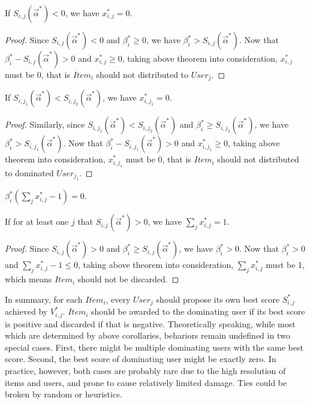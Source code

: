 \documentclass[sigconf]{acmart}
\newcommand{\sx}{x_{i,j}}
\newcommand{\sV}{V_{i,j}}
\newcommand{\sbeta}{\beta_i}
\newcommand{\sS}{S_{i,j}}
\newcommand{\valpha}{\vec{\alpha}}
\begin{document}
\begin{corollary}
If $\sS(\valpha^*) < 0$, we have $\sx^* = 0$.
\end{corollary}

\begin{proof}
Since $\sS(\valpha^*) < 0$ and $\sbeta^* \ge 0$, we have $\sbeta^* > \sS(\valpha^*)$.
Now that $\sbeta^* - \sS(\valpha^*) > 0$ and $\sx^* \ge 0$,
    taking above theorem into consideration, $\sx^*$ must be 0,
    that is $Item_i$ should not distributed to $User_j$.
\end{proof}

\begin{corollary}
If $S_{i,j_1}(\valpha^*) < S_{i,j_2}(\valpha^*)$, we have $x_{i,j_1}^* = 0$.
\end{corollary}

\begin{proof}
Similarly, since $S_{i,j_1}(\valpha^*) < S_{i,j_2}(\valpha^*)$ and $\sbeta^* \ge S_{i,j_2}(\valpha^*)$,
    we have $\sbeta^* > S_{i,j_1}(\valpha^*)$.
Now that $\sbeta^* - S_{i,j_1}(\valpha^*) > 0$ and $x_{i,j_1}^* \ge 0$, 
    taking above theorem into consideration, $x_{i,j_1}^*$ must be 0,
    that is $Item_i$ should not distributed to dominated $User_{j_1}$.
\end{proof}

\begin{theorem}
$\sbeta^*(\sum\limits_j \sx^* - 1) = 0$.
\end{theorem}

\begin{corollary}
If for at least one $j$ that $\sS(\valpha^*) > 0$, we have $\sum\limits_j \sx^* = 1$.
\end{corollary}

\begin{proof}
Since $\sS(\valpha^*) > 0$ and $\sbeta^* \ge \sS(\valpha^*)$, we have $\sbeta^* > 0$.
Now that $\sbeta^* > 0$ and $\sum\limits_j \sx^* - 1 \le 0$,
    taking above theorem into consideration, $\sum\limits_j \sx^*$ must be 1,
    which means $Item_i$ should not be discarded.
\end{proof}

In summary, for each $Item_i$, every $User_j$ should propose its own best score $\sS^*$ achieved by $\sV^*$.
$Item_i$ should be awarded to the dominating user if its best score is positive and discarded if that is negative.
Theoretically speaking, while most which are determined by above corollaries, behariors remain undefined in two special cases.
First, there might be multiple dominating users with the same best score.
Second, the best score of dominating user might be exactly zero.
In practice, however, both cases are probably rare due to the high resolution of items and users, and prone to cause relatively limited damage.
Ties could be broken by random or heuristics.
\end{document}
